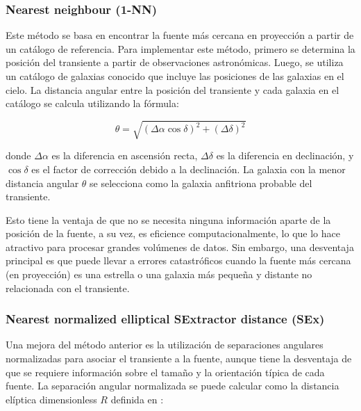 \documentclass[../tesis.tex]{subfiles}
\begin{document}
\subsubsection{Nearest neighbour (1-NN)}
Este método se basa en encontrar la fuente más cercana en proyección a partir de un catálogo de referencia. Para implementar este método, primero se determina la posición del transiente a partir de observaciones astronómicas. Luego, se utiliza un catálogo de galaxias conocido que incluye las posiciones de las galaxias en el cielo. La distancia angular entre la posición del transiente y cada galaxia en el catálogo se calcula utilizando la fórmula:\par\null\par

\[
\theta = \sqrt{(\Delta \alpha \cos \delta)^2 + (\Delta \delta)^2}
\]

donde \(\Delta \alpha\) es la diferencia en ascensión recta, \(\Delta \delta\) es la diferencia en declinación, y \(\cos \delta\) es el factor de corrección debido a la declinación. La galaxia con la menor distancia angular \(\theta\) se selecciona como la galaxia anfitriona probable del transiente. \par\null\par
 
Esto tiene la ventaja de que no se necesita ninguna información aparte de la posición de la fuente, a su vez, es eficience computacionalmente, lo que lo hace atractivo para procesar grandes volúmenes de datos. Sin embargo, una desventaja principal es que puede llevar a errores catastróficos cuando la fuente más cercana (en proyección) es una estrella o una galaxia más pequeña y distante no relacionada con el transiente.\par\null\par

\subsubsection{Nearest normalized elliptical SExtractor distance (SEx)}
Una mejora del método anterior es la utilización de separaciones angulares normalizadas para asociar el transiente a la fuente, aunque tiene la desventaja de que se requiere información sobre el tamaño y la orientación típica de cada fuente. La separación angular normalizada se puede calcular como la distancia elíptica dimensionless \(R\) definida en \cite{Sullivan2006}:\par\null\par
\end{document}
